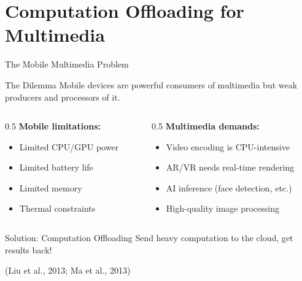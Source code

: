 \documentclass[aspectratio=169,12pt]{beamer}
\begin{document}
\section{Computation Offloading for Multimedia}

\begin{frame}{The Mobile Multimedia Problem}
    \begin{alertblock}{The Dilemma}
        Mobile devices are powerful consumers of multimedia but weak producers and processors of it.
    \end{alertblock}
    
    \vspace{0.3cm}
    \begin{columns}
        \begin{column}{0.5\textwidth}
            \textbf{Mobile limitations:}
            \begin{itemize}
                \item Limited CPU/GPU power
                \item Limited battery life
                \item Limited memory
                \item Thermal constraints
            \end{itemize}
        \end{column}
        \begin{column}{0.5\textwidth}
            \textbf{Multimedia demands:}
            \begin{itemize}
                \item Video encoding is CPU-intensive
                \item AR/VR needs real-time rendering
                \item AI inference (face detection, etc.)
                \item High-quality image processing
            \end{itemize}
        \end{column}
    \end{columns}
    
    \vspace{0.3cm}
    \begin{block}{Solution: Computation Offloading}
        Send heavy computation to the cloud, get results back!
        
        (Liu et al., 2013; Ma et al., 2013)
    \end{block}
\end{frame}
\end{document}
